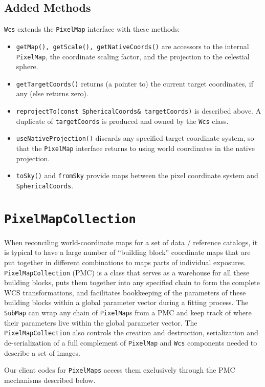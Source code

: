 \documentclass[11pt,preprint,flushrt]{aastex}
\begin{document}
\subsection{Added Methods}
\texttt{Wcs} extends the \texttt{PixelMap} interface with these methods:
\begin{itemize}
\item {\tt getMap(), getScale(), getNativeCoords()} are accessors to the internal {\tt PixelMap}, the coordinate scaling factor, and the projection to the celestial sphere.
\item {\tt getTargetCoords()} returns (a pointer to) the current target coordinates, if any (else returns zero).
\item {\tt reprojectTo(const SphericalCoords\& targetCoords)} is described above.  A duplicate of {\tt targetCoords} is produced and owned by the {\tt Wcs} class.
\item {\tt useNativeProjection()} discards any specified target coordinate system, so that the {\tt PixelMap} interface returns to using world coordinates in the native projection.
\item {\texttt{toSky()} and \texttt{fromSky}} provide maps between the pixel coordinate system and \texttt{SphericalCoords}.
\end{itemize}

\section{\texttt{PixelMapCollection}}
\label{pmc}

When reconciling world-coordinate maps for a set of data / reference catalogs, it is typical to have a large number of ``building block'' coordinate maps that are put together in different combinations to maps parts of individual exposures.  {\tt PixelMapCollection} (PMC) is a class that serves as a warehouse for all these building blocks, puts them together into any specified chain to form the complete WCS transformations, and facilitates bookkeeping of the parameters of these building blocks within a global parameter vector during a fitting process.  The {\tt SubMap} can wrap any chain of {\tt PixelMap}s from a PMC and keep track of where their parameters live within the global parameter vector.  The {\tt PixelMapCollection} also controls the creation and destruction, serialization and de-serialization of a full complement of {\tt PixelMap} and {\tt Wcs} components needed to describe a set of images.

Our client codes for \texttt{PixelMaps} access them exclusively through the PMC mechanisms described below. 
\end{document}
